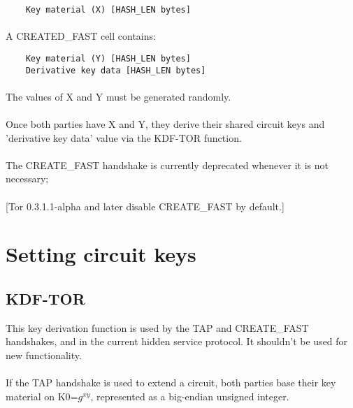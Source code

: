 \begin{verbatim}
    Key material (X) [HASH_LEN bytes]
\end{verbatim}

\paragraph{}
A CREATED\_FAST cell contains:

\begin{verbatim}
    Key material (Y) [HASH_LEN bytes]
    Derivative key data [HASH_LEN bytes]
\end{verbatim}

\paragraph{}
The values of X and Y must be generated randomly.

\paragraph{}
Once both parties have X and Y, they derive their shared circuit keys
and 'derivative key data' value via the KDF-TOR function.

\paragraph{}
The CREATE\_FAST handshake is currently deprecated whenever it is not
necessary;

\paragraph{}
[Tor 0.3.1.1-alpha and later disable CREATE\_FAST by default.]

\section{Setting circuit keys}

\subsection{KDF-TOR}
This key derivation function is used by the TAP and CREATE\_FAST
handshakes, and in the current hidden service protocol. It shouldn't
be used for new functionality.

\paragraph{}
If the TAP handshake is used to extend a circuit, both parties
base their key material on K0=$g^{xy}$, represented as a big-endian unsigned
integer.

